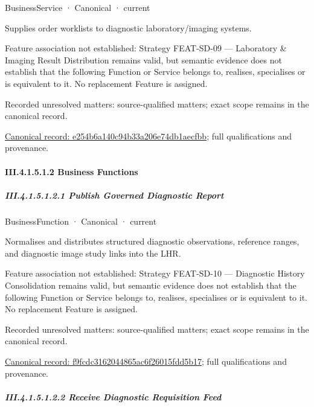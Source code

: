 \label{element:e254b6a140c94b33a206e74db1aecfbb}
{\small BusinessService · Canonical · current}\par

Supplies order worklists to diagnostic laboratory/imaging systems.



Feature association not established: Strategy FEAT-SD-09 — Laboratory \& Imaging Result Distribution remains valid, but semantic evidence does not establish that the following Function or Service belongs to, realises, specialises or is equivalent to it. No replacement Feature is assigned.


{\small Recorded unresolved matters: source-qualified matters; exact scope remains in the canonical record.}\par
{\footnotesize \href{../../../../continuum/business/business-service/e254b6a140c94b33a206e74db1aecfbb.md}{Canonical record: e254b6a140c94b33a206e74db1aecfbb}; full qualifications and provenance.}\par
\paragraph*{III.4.1.5.1.2 Business Functions}
\label{navigation:III.4.1.5.1.2}

\subparagraph*{III.4.1.5.1.2.1 Publish Governed Diagnostic Report}
\label{navigation:III.4.1.5.1.2.1}

\label{element:f9fcdc3162044865ac6f26015fdd5b17}
{\small BusinessFunction · Canonical · current}\par

Normalises and distributes structured diagnostic observations, reference ranges, and diagnostic image study links into the LHR.



Feature association not established: Strategy FEAT-SD-10 — Diagnostic History Consolidation remains valid, but semantic evidence does not establish that the following Function or Service belongs to, realises, specialises or is equivalent to it. No replacement Feature is assigned.


{\small Recorded unresolved matters: source-qualified matters; exact scope remains in the canonical record.}\par
{\footnotesize \href{../../../../continuum/business/business-function/f9fcdc3162044865ac6f26015fdd5b17.md}{Canonical record: f9fcdc3162044865ac6f26015fdd5b17}; full qualifications and provenance.}\par
\subparagraph*{III.4.1.5.1.2.2 Receive Diagnostic Requisition Feed}
\label{navigation:III.4.1.5.1.2.2}

